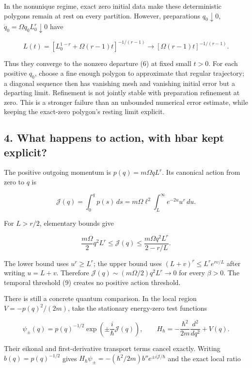 \documentclass[11pt,a4paper]{article}
\begin{document}
In the nonunique regime, exact zero initial data make these
deterministic polygons remain at rest on every partition. However,
preparations \(q_0\downarrow0\), \(\dot q_0=\Omega q_0L_0^r\downarrow0\)
have

\[
 L(t)=\left[L_0^{1-r}+\Omega(r-1)t\right]^{-1/(r-1)}
       \longrightarrow [\Omega(r-1)t]^{-1/(r-1)}.
 \tag{10}
\]

Thus they converge to the nonzero departure (6) at fixed small \(t>0\).
For each positive \(q_0\), choose a fine enough polygon to approximate
that regular trajectory; a diagonal sequence then has vanishing mesh and
vanishing initial error but a departing limit. Refinement is not jointly
stable with preparation refinement at zero. This is a stronger failure
than an unbounded numerical error estimate, while keeping the exact-zero
polygon's resting limit explicit.

\subsection{4. What happens to action, with hbar kept
explicit?}\label{what-happens-to-action-with-hbar-kept-explicit}

The positive outgoing momentum is \(p(q)=m\Omega qL^r\). Its canonical
action from zero to \(q\) is

\[
 \mathcal J(q)=\int_0^q p(s)\,ds
       =m\Omega\ell^2\int_L^\infty e^{-2u}u^r\,du.
 \tag{11}
\]

For \(L>r/2\), elementary bounds give

\[
 \frac{m\Omega}2q^2L^r
 \le\mathcal J(q)
 \le\frac{m\Omega q^2L^r}{2-r/L}.
 \tag{12}
\]

The lower bound uses \(u^r\ge L^r\); the upper bound uses
\((L+v)^r\le L^r e^{rv/L}\) after writing \(u=L+v\). Therefore
\(\mathcal J(q)\sim(m\Omega/2)q^2L^r\to0\) for every \(\beta>0\). The
temporal threshold (9) creates no positive action threshold.

There is still a concrete quantum comparison. In the local region
\(V=-p(q)^2/(2m)\), take the stationary energy-zero test functions

\[
 \psi_\pm(q)=p(q)^{-1/2}
          \exp\left(\pm\frac{i}{\hbar}\mathcal J(q)\right),
 \qquad H_\hbar=-\frac{\hbar^2}{2m}\frac{d^2}{dq^2}+V(q).
 \tag{13}
\]

Their eikonal and first-derivative transport terms cancel exactly.
Writing \(b(q)=p(q)^{-1/2}\) gives \(H_\hbar\psi_\pm
=-(\hbar^2/2m)b''e^{\pm i\mathcal J/\hbar}\) and the exact local ratio
\end{document}
